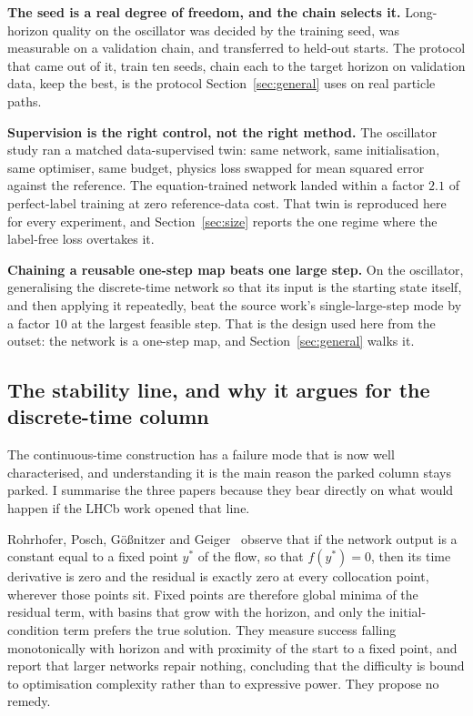 \documentclass[11pt,a4paper]{article}
\begin{document}
\textbf{The seed is a real degree of freedom, and the chain selects it.}
Long-horizon quality on the oscillator was decided by the training seed, was
measurable on a validation chain, and transferred to held-out starts. The
protocol that came out of it, train ten seeds, chain each to the target horizon
on validation data, keep the best, is the protocol
Section~\ref{sec:general} uses on real particle paths.

\textbf{Supervision is the right control, not the right method.} The oscillator
study ran a matched data-supervised twin: same network, same initialisation,
same optimiser, same budget, physics loss swapped for mean squared error against
the reference. The equation-trained network landed within a factor $2.1$ of
perfect-label training at zero reference-data cost. That twin is reproduced here
for every experiment, and Section~\ref{sec:size} reports the one regime where
the label-free loss overtakes it.

\textbf{Chaining a reusable one-step map beats one large step.} On the
oscillator, generalising the discrete-time network so that its input is the
starting state itself, and then applying it repeatedly, beat the source work's
single-large-step mode by a factor $10$ at the largest feasible step. That is
the design used here from the outset: the network is a one-step map, and
Section~\ref{sec:general} walks it.

\subsection{The stability line, and why it argues for the discrete-time column}
\label{sec:stability}

The continuous-time construction has a failure mode that is now well
characterised, and understanding it is the main reason the parked column stays
parked. I summarise the three papers because they bear directly on what would
happen if the LHCb work opened that line.

Rohrhofer, Posch, G\"o\ss{}nitzer and Geiger~\cite{rohrhofer2023} observe that
if the network output is a constant equal to a fixed point $y^\ast$ of the flow,
so that $f(y^\ast) = 0$, then its time derivative is zero and the residual is
exactly zero at every collocation point, wherever those points sit. Fixed points
are therefore global minima of the residual term, with basins that grow with the
horizon, and only the initial-condition term prefers the true solution. They
measure success falling monotonically with horizon and with proximity of the
start to a fixed point, and report that larger networks repair nothing,
concluding that the difficulty is bound to optimisation complexity rather than
to expressive power. They propose no remedy.
\end{document}

